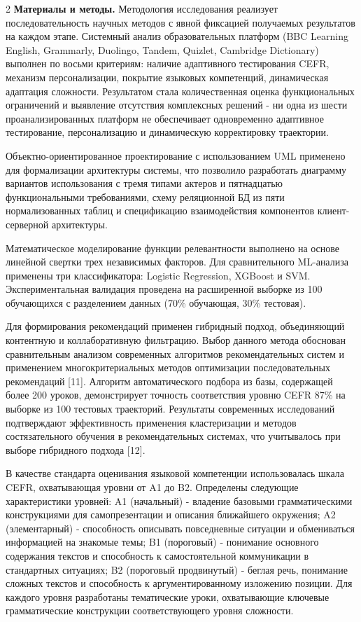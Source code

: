 \begin{multicols}{2}
{\bfseries Материалы и методы.} Методология исследования реализует
последовательность научных методов с явной фиксацией получаемых
результатов на каждом этапе. Системный анализ образовательных платформ
(BBC Learning English, Grammarly, Duolingo, Tandem, Quizlet, Cambridge
Dictionary) выполнен по восьми критериям: наличие адаптивного
тестирования CEFR, механизм персонализации, покрытие языковых
компетенций, динамическая адаптация сложности. Результатом стала
количественная оценка функциональных ограничений и выявление отсутствия
комплексных решений - ни одна из шести проанализированных платформ не
обеспечивает одновременно адаптивное тестирование, персонализацию и
динамическую корректировку траектории.

Объектно-ориентированное проектирование с использованием UML применено
для формализации архитектуры системы, что позволило разработать
диаграмму вариантов использования с тремя типами актеров и пятнадцатью
функциональными требованиями, схему реляционной БД из пяти
нормализованных таблиц и спецификацию взаимодействия компонентов
клиент-серверной архитектуры.

Математическое моделирование функции релевантности выполнено на основе
линейной свертки трех независимых факторов. Для сравнительного
ML-анализа применены три классификатора: Logistic Regression, XGBoost и
SVM. Экспериментальная валидация проведена на расширенной выборке из 100
обучающихся с разделением данных (70\% обучающая, 30\% тестовая).

Для формирования рекомендаций применен гибридный подход, объединяющий
контентную и коллаборативную фильтрацию. Выбор данного метода обоснован
сравнительным анализом современных алгоритмов рекомендательных систем и
применением многокритериальных методов оптимизации последовательных
рекомендаций {[}11{]}. Алгоритм автоматического подбора из базы,
содержащей более 200 уроков, демонстрирует точность соответствия уровню
CEFR 87\% на выборке из 100 тестовых траекторий. Результаты современных
исследований подтверждают эффективность применения кластеризации и
методов состязательного обучения в рекомендательных системах, что
учитывалось при выборе гибридного подхода {[}12{]}.

В качестве стандарта оценивания языковой компетенции использовалась
шкала CEFR, охватывающая уровни от A1 до B2. Определены следующие
характеристики уровней: A1 (начальный) - владение базовыми
грамматическими конструкциями для самопрезентации и описания ближайшего
окружения; A2 (элементарный) - способность описывать повседневные
ситуации и обмениваться информацией на знакомые темы; B1 (пороговый) -
понимание основного содержания текстов и способность к самостоятельной
коммуникации в стандартных ситуациях; B2 (пороговый продвинутый) -
беглая речь, понимание сложных текстов и способность к
аргументированному изложению позиции. Для каждого уровня разработаны
тематические уроки, охватывающие ключевые грамматические конструкции
соответствующего уровня сложности.


\end{multicols}
